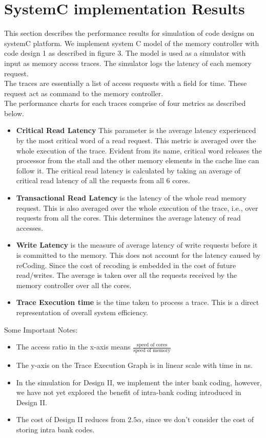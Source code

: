 \cleardoublepage
\section{SystemC implementation Results}
This section describes the performance results for simulation of code designs on 
systemC platform. We implement system C model of the memory controller with code 
design 1 as described in figure 3. The model is used as a simulator with input 
as memory access traces. The simulator logs the latency of each memory request. 
\\ 
The traces are essentially a list of access requests with a field for time. These request act as command to the memory controller. \\
The performance charts for each traces comprise of four metrics as described 
below. 
\begin{itemize}
	\item {\bf Critical Read Latency} This parameter is the average latency 
		experienced by the most critical word of a read request. This 
		metric is averaged over the whole execution of the trace. 
		Evident from its name, critical word releases the processor from 
		the stall and the other memory elements in the cache line can 
		follow it. The critical read latency is calculated by taking an 
		average of critical read latency of all the requests from all 6 cores. 
	\item {\bf Transactional Read Latency} is the latency of the whole read 
		memory request. This is also averaged over the whole execution 
		of the trace, i.e., over requests from all the cores. This determines 
		the average latency of read accesses.
	\item {\bf Write Latency} is the measure of average latency of write 
		requests before it is committed to the memory. This does not 
		account for the latency caused by reCoding. Since the cost of 
		recoding is embedded in the cost of future read/writes. The 
		average is taken over all the requests received by the memory 
		controller over all the cores.
	\item {\bf Trace Execution time} is the time taken to process a trace. 
		This is a direct representation of overall system efficiency. 
\end{itemize}
Some Important Notes:
\begin{itemize}
	\item The access ratio in the x-axis means $\frac{\text{speed of cores}}{\text{speed of memory}}$
	\item The y-axis on the Trace Execution Graph is in linear scale with time in ns.
	\item In the simulation for Design II, we implement the inter bank coding, however, we have not yet explored the benefit of intra-bank coding introduced in Design II.
	\item The cost of Design II reduces from $2.5 \alpha$, since we don't consider the cost of storing intra bank codes. 
\end{itemize}
